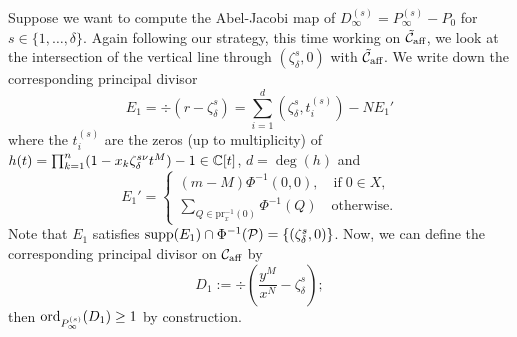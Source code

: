 \documentclass[main.tex]{subfiles}
\begin{document}
   Suppose we want to compute the Abel-Jacobi map of $D_{\infty}^{(s)} = P_{\infty}^{(s)} - P_0$ for $s \in \{1,\dots,\delta\}$.
   Again following our strategy,
   this time working on $\tilde{\mathcal{C}}_{\text{aff}}$, we look at the intersection of the vertical line through $(\zeta_{\delta}^s,0)$ with
   $\tilde{\mathcal{C}}_{\text{aff}}$. We write down the corresponding principal divisor 
   \begin{equation*}
      E_1 = \div(r - \zeta_{\delta}^s) = \sum_{i = 1}^{d} \left(\zeta_{\delta}^s,t_i^{(s)}\right) - N E_1'
   \end{equation*}
      where the $t_i^{(s)}$ are the zeros (up to multiplicity) of $h(t) = \prod_{k=1}^n (1-x_k\zeta_{\delta}^{s\nu}t^M) - 1 \in \mathbb{C}[t]$, $d = \deg(h)$ and
    \begin{equation}\label{eq:zero_bp1}
       E_1' = \begin{cases}
	     (m-M) \Phi^{-1}(0,0), \quad \text{if} \; 0 \in X, \\
             \sum_{Q \in\text{pr}_x^{-1}(0)} \Phi^{-1}(Q) \quad \text{otherwise.}
            \end{cases}
    \end{equation}
    Note that $E_1$ satisfies $\operatorname{supp}(E_1) \cap \Phi^{-1}(\mathcal{P}) = \{ (\zeta_{\delta}^s,0) \}$.
    Now, we can define the corresponding principal divisor on $\mathcal{C}_{\text{aff}}$ by
    \begin{equation*}
       D_1 := \div \left( \frac{y^M}{x^N} - \zeta_{\delta}^s \right);
    \end{equation*}
   then $\operatorname{ord}_{P_{\infty}^{(s)}}(D_1) \ge 1$ by construction.
\end{document}
